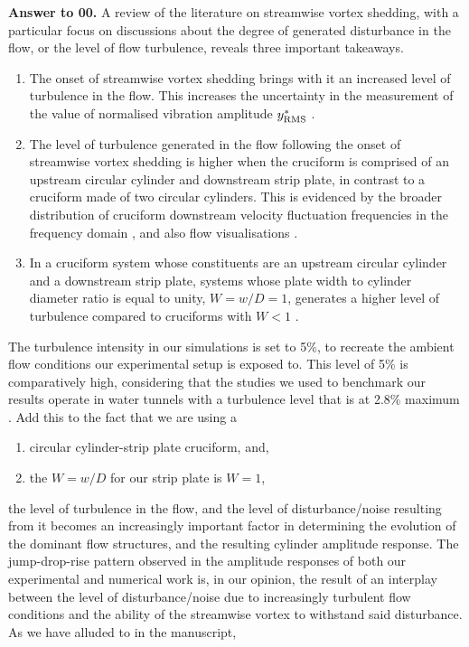 \documentclass[10pt]{article}
\newcounter{question}
\newcommand{\name}{00}
\newcommand{\answer}[1]{\noindent \textbf{Answer to \name.\thequestion}\vskip 0.25cm \noindent #1 \mbox{}\\}
\begin{document}
\answer{
  A review of the literature on streamwise vortex shedding, with a particular focus on discussions about the degree of generated disturbance in the flow, or the level of flow turbulence, reveals three important takeaways.

  \begin{enumerate}
    \item The onset of streamwise vortex shedding brings with it an increased level of turbulence in the flow. This increases the uncertainty in the measurement of the \rms{} value of normalised vibration amplitude $y^{*}_{\text{RMS}}$ \citep{Shirakashi1989,Zhao2018a}.
    \item The level of turbulence generated  in the flow following the onset of streamwise vortex shedding is higher when the cruciform is comprised of an upstream circular cylinder and downstream strip plate, in contrast to a cruciform made of two circular cylinders. This is evidenced by the broader distribution of cruciform downstream velocity fluctuation frequencies in the frequency domain \citep{Kato2006,Kato2012}, and also flow visualisations \citep{Kato2012,Koide2017}.
    \item In a cruciform system whose constituents are an upstream circular cylinder and a downstream strip plate, systems whose plate width to cylinder diameter ratio is equal to unity, $W = w/D = 1$, generates a higher level of turbulence compared to cruciforms with $W < 1$ \citep{Kato2012}.
  \end{enumerate}

  The turbulence intensity in our simulations is set to 5\%, to recreate the ambient flow conditions our experimental setup is exposed to. This level of 5\% is comparatively high, considering that the studies we used to benchmark our results operate in water tunnels with a turbulence level that is at 2.8\% maximum \citep{Nguyen2012,Koide2013}. Add this to the fact that we are using a 

  \begin{enumerate}
    \item circular cylinder-strip plate cruciform, and,
    \item the $W = w/D$ for our strip plate is $W = 1$,
  \end{enumerate}

  \noindent the level of turbulence in the flow, and the level of disturbance/noise resulting from it becomes an increasingly important factor in determining the evolution of the dominant flow structures, and the resulting cylinder amplitude response. The jump-drop-rise pattern observed in the amplitude responses of both our experimental and numerical work is, in our opinion, the result of an interplay between the level of disturbance/noise due to increasingly turbulent flow conditions and the ability of the streamwise vortex to withstand said disturbance. As we have alluded to in the manuscript,

}
\end{document}
